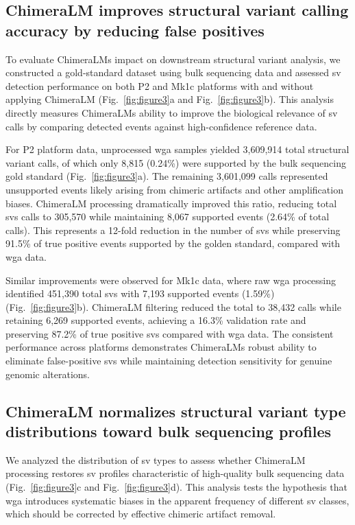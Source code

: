 \documentclass[pdflatex,sn-nature]{sn-jnl}%
\theoremstyle{thmstyleone}%
\theoremstyle{thmstyletwo}%
\theoremstyle{thmstylethree}%
\begin{document}
\subsection*{ChimeraLM improves structural variant calling accuracy by reducing false positives}

To evaluate ChimeraLM\textquotesingle s impact on downstream structural variant analysis, we constructed a gold-standard dataset using bulk sequencing data and assessed \gls{sv} detection performance on both P2 and Mk1c platforms with and without applying ChimeraLM (Fig.~\ref{fig:figure3}a and Fig.~\ref{fig:figure3}b).
This analysis directly measures ChimeraLM\textquotesingle s ability to improve the biological relevance of \gls{sv} calls by comparing detected events against high-confidence reference data.

For P2 platform data, unprocessed \gls{wga} samples yielded 3,609,914 total structural variant calls, of which only 8,815 (0.24\%) were supported by the bulk sequencing gold standard (Fig.~\ref{fig:figure3}a).
The remaining 3,601,099 calls represented unsupported events likely arising from chimeric artifacts and other amplification biases.
ChimeraLM processing dramatically improved this ratio, reducing total \glspl{sv} calls to 305,570 while maintaining 8,067 supported events (2.64\% of total calls).
This represents a 12-fold reduction in the number of \glspl{sv} while preserving 91.5\% of true positive events supported by the golden standard, compared with \gls{wga} data.

Similar improvements were observed for Mk1c data, where raw \gls{wga} processing identified 451,390 total \glspl{sv} with 7,193 supported events (1.59\%) (Fig.~\ref{fig:figure3}b).
ChimeraLM filtering reduced the total to 38,432 calls while retaining 6,269 supported events, achieving a 16.3\% validation rate and preserving 87.2\% of true positive \glspl{sv} compared with \gls{wga} data.
The consistent performance across platforms demonstrates ChimeraLM\textquotesingle s robust ability to eliminate false-positive \glspl{sv} while maintaining detection sensitivity for genuine genomic alterations.

\subsection*{ChimeraLM normalizes structural variant type distributions toward bulk sequencing profiles}

We analyzed the distribution of \gls{sv} types to assess whether ChimeraLM processing restores \gls{sv} profiles characteristic of high-quality bulk sequencing data (Fig.~\ref{fig:figure3}c and Fig.~\ref{fig:figure3}d).
This analysis tests the hypothesis that \gls{wga} introduces systematic biases in the apparent frequency of different \gls{sv} classes, which should be corrected by effective chimeric artifact removal.
\end{document}
